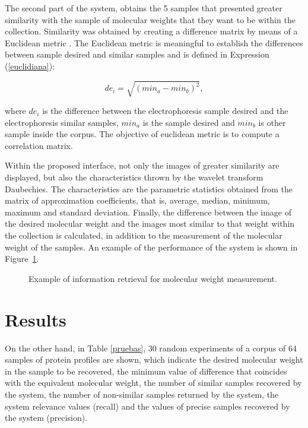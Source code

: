 \documentclass[a4paper]{llncs}
\begin{document}
The second part of the system, obtains the 5 samples that presented greater similarity with the sample of molecular weights that they want to be within the collection. Similarity was obtained by creating a difference matrix by means of a Euclidean metric \cite{Baeza}. The Euclidean metric is meaningful to establish the differences between sample desired and similar samples and is defined in Expression (\ref{euclidiana}): 

\begin{equation}
de_i= \sqrt{(min_{a}-min_{b})^{2}},
\label{euclidiana}
\end{equation}

\noindent where $de_i$ is the difference between the electrophoresis sample desired and the electrophoresis similar samples, $min_{a}$ is the sample desired and $min_{b}$ is other sample inside the corpus. The objective of euclidean metric is to compute a correlation matrix. 

Within the proposed interface, not only the images of greater similarity are displayed, but also the characteristics thrown by the wavelet transform Daubechies. The characteristics are the parametric statistics obtained from the matrix of approximation coefficients, that is, average, median, minimum, maximum and standard deviation. Finally, the difference between the image of the desired molecular weight and the images most similar to that weight within the collection is calculated, in addition to the measurement of the molecular weight of the samples. An example of the performance of the system is shown in Figure~\ref{pantalla2}.


\begin{figure}[h!]
\centering{
}
\caption{Example of information retrieval for molecular weight measurement.} \label{pantalla2}
\end{figure}

\section{Results}


On the other hand, in Table \ref{pruebas}, 30 random experiments of a corpus of 64 samples of protein profiles are shown, which indicate the desired molecular weight in the sample to be recovered, the minimum value of difference that coincides with the equivalent molecular weight, the number of similar samples recovered by the system, the number of non-similar samples returned by the system, the system relevance values (recall) and the values of precise samples recovered by the system (precision). 
\end{document}
